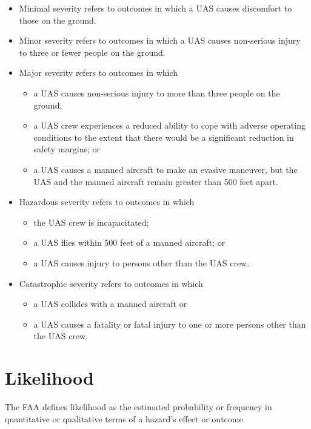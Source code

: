 \documentclass[
]{book}
\providecommand{\tightlist}{%
  \setlength{\itemsep}{0pt}\setlength{\parskip}{0pt}}
\begin{document}
\begin{itemize}
\item
  Minimal severity refers to outcomes in which a UAS causes discomfort to those on the ground.
\item
  Minor severity refers to outcomes in which a UAS causes non-serious injury to three or fewer people on the ground.
\item
  Major severity refers to outcomes in which

  \begin{itemize}
  \tightlist
  \item
    a UAS causes non-serious injury to more than three people on the ground;
  \item
    a UAS crew experiences a reduced ability to cope with adverse operating conditions to the extent that there would be a significant reduction in safety margins; or
  \item
    a UAS causes a manned aircraft to make an evasive maneuver, but the UAS and the manned aircraft remain greater than 500 feet apart.
  \end{itemize}
\item
  Hazardous severity refers to outcomes in which

  \begin{itemize}
  \tightlist
  \item
    the UAS crew is incapacitated;
  \item
    a UAS flies within 500 feet of a manned aircraft; or
  \item
    a UAS causes injury to persons other than the UAS crew.
  \end{itemize}
\item
  Catastrophic severity refers to outcomes in which

  \begin{itemize}
  \tightlist
  \item
    a UAS collides with a manned aircraft or
  \item
    a UAS causes a fatality or fatal injury to one or more persons other than the UAS crew.
  \end{itemize}
\end{itemize}

\hypertarget{likelihood}{%
\section{Likelihood}\label{likelihood}}

The FAA defines likelihood as the estimated probability or frequency in quantitative or qualitative terms of a hazard's effect or outcome.
\end{document}
